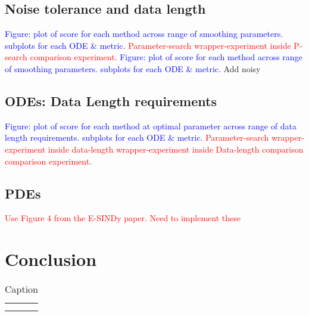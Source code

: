 \documentclass{article}[letterpaper]
\begin{document}
\subsection{Noise tolerance and data length}
\textcolor{blue}{Figure: plot of score for each method across range of smoothing parameters.  subplots for each ODE \& metric}.  \textcolor{red}{Parameter-search wrapper-experiment inside P-search comparison experiment}.
\textcolor{blue}{Figure: plot of score for each method across range of smoothing parameters.  subplots for each ODE \& metric}. 
Add noisy 
\subsection{ODEs: Data Length requirements}
\textcolor{blue}{Figure: plot of score for each method at optimal parameter across range of data length requirements.  subplots for each ODE \& metric}.  \textcolor{red}{Parameter-search wrapper-experiment inside data-length wrapper-experiment inside Data-length comparison comparison experiment}.
\subsection{PDEs}
\textcolor{red}{Use Figure 4 from the E-SINDy paper. Need to implement these}
\section{Conclusion}
\begin{table}
    \centering
    \begin{tabular}{c|c}
         &  \\
         & 
    \end{tabular}
    \caption{Caption}
    \label{tab:my_label}
\end{table}
\end{document}
